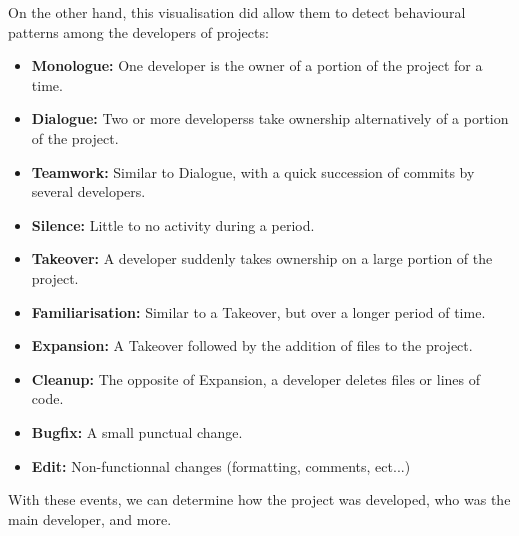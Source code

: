 On the other hand, this visualisation did allow them to detect behavioural patterns among the developers of projects:
\begin{itemize}
\itemsep-0.6em
\item \textbf{Monologue:} One developer is the owner of a portion of the project for a time.
\item \textbf{Dialogue:} Two or more developerss take ownership alternatively of a portion of the project.
\item \textbf{Teamwork:} Similar to Dialogue, with a quick succession of commits by several developers.
\item \textbf{Silence:} Little to no activity during a period.
\item \textbf{Takeover:} A developer suddenly takes ownership on a large portion of the project.
\item \textbf{Familiarisation:} Similar to a Takeover, but over a longer period of time.
\item \textbf{Expansion:} A Takeover followed by the addition of files to the project.
\item \textbf{Cleanup:} The opposite of Expansion, a developer deletes files or lines of code.
\item \textbf{Bugfix:} A small punctual change.
\item \textbf{Edit:} Non-functionnal changes (formatting, comments, ect...)
\end{itemize}

With these events, we can determine how the project was developed, who was the main developer, and more.